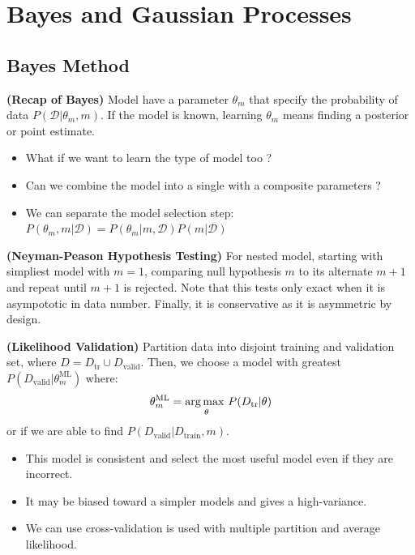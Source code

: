 \section{Bayes and Gaussian Processes}

\subsection{Bayes Method}

\begin{remark}{\textbf{(Recap of Bayes)}}
    Model have a parameter $\theta_m$ that specify the probability of data $P(\mathcal{D}|\theta_m, m)$. If the model is known, learning $\theta_m$ means finding a posterior or point estimate. 
    \begin{itemize}
        \item What if we want to learn the type of model too ?
        \item Can we combine the model into a single  with a composite parameters ? 
        \item We can separate the model selection step: $P(\theta_m,m | \mathcal{D}) = P(\theta_m|m,\mathcal{D})P(m|\mathcal{D})$
    \end{itemize}
\end{remark}

\begin{definition}{\textbf{(Neyman-Peason Hypothesis Testing)}}
    For nested model, starting with simpliest model with $m=1$, comparing null hypothesis $m$ to its alternate $m+1$ and repeat until $m+1$ is rejected. Note that this tests only exact when it is asympototic in data number. Finally, it is conservative as it is asymmetric by design.
\end{definition}

\begin{definition}{\textbf{(Likelihood Validation)}}
    Partition data into disjoint training and validation set, where $D = D_\text{tr}\cup D_\text{valid}$. Then, we choose a model with greatest $P(D_\text{valid} | \theta^\text{ML}_m)$ where:
    \begin{equation*}
        \theta^\text{ML}_m = \underset{\theta}{\arg\max \ }P(D_\text{tr}|\theta)
    \end{equation*}
    or if we are able to find $P(D_\text{valid}|D_\text{train}, m)$. 
    \begin{itemize}
        \item This model is consistent and select the most useful model even if they are incorrect. 
        \item It may be biased toward a simpler models and gives a high-variance. 
        \item We can use cross-validation is used with multiple partition and average likelihood. 
    \end{itemize}
\end{definition}

